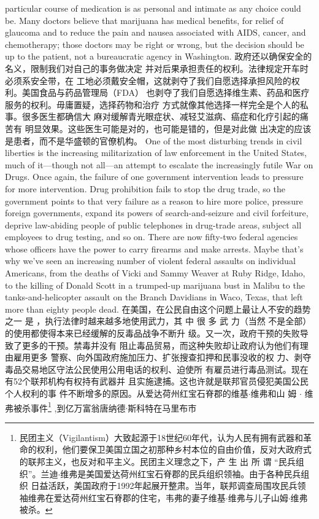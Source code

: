 \begin{paracol}{2}
particular course of medication is as personal and intimate as any choice could be. Many doctors believe that marijuana has
medical benefits, for relief of glaucoma and to reduce the pain
and nausea associated with AIDS, cancer, and chemotherapy;
those doctors may be right or wrong, but the decision should be
up to the patient, not a bureaucratic agency in Washington.
\switchcolumn
政府还以确保安全的名义，限制我们对自己的事务做决定
并对后果承担责任的权利。法律规定开车时必须系安全带，在
工地必须戴安全帽，这就剥夺了我们自愿选择承担风险的权
利。美国食品与药品管理局（FDA） 也剥夺了我们自愿选择维生素、药品和医疗服务的权利。毋庸置疑，选择药物和治疗
方式就像其他选择一样完全是个人的私事。很多医生都确信大
麻对缓解青光眼症状、减轻艾滋病、癌症和化疗引起的痛苦有
明显效果。这些医生可能是对的，也可能是错的，但是对此做
出决定的应该是患者，而不是华盛顿的官僚机构。
\switchcolumn*
One of the most disturbing trends in civil liberties is the increasing militarization of law enforcement in the United States,
much of it---though not all---an attempt to escalate the increasingly futile War on Drugs. Once again, the failure of one
government intervention leads to pressure for more intervention. Drug prohibition fails to stop the drug trade, so the government points to that very failure as a reason to hire more
police, pressure foreign governments, expand its powers of
search-and-seizure and civil forfeiture, deprive law-abiding people of public telephones in drug-trade areas, subject all employees to drug testing, and so on. There are now fifty-two federal
agencies whose officers have the power to carry firearms and
make arrests. Maybe that's why we've seen an increasing number of violent federal assaults on individual Americans, from the
deaths of Vicki and Sammy Weaver at Ruby Ridge, Idaho, to
the killing of Donald Scott in a trumped-up marijuana bust in
Malibu to the tanks-and-helicopter assault on the Branch Davidians in Waco, Texas, that left more than eighty people dead.
\switchcolumn
在美国，在公民自由这个问题上最让人不安的趋势之一
是 ，执行法律时越来越多地使用武力，其 中 很 多 武 力（当然
不是全部）的使用都使得本来已经缓解的反毒品战争不断升
级。又一次，政府干预的失败导致了更多的干预。禁毒并没有
阻止毒品贸易，而这种失败却让政府认为他们有理由雇用更多
警察、向外国政府施加压力、扩张搜查扣押和民事没收的权
力、剥夺毒品交易地区守法公民使用公用电话的权利、迫使所
有雇员进行毒品测试。现在有52个联邦机构有权持有武器并
且实施逮捕。这也许就是联邦官员侵犯美国公民个人权利的事
件不断增多的原因。从爱达荷州红宝石脊郡的维基$\cdot$维弗和山
姆 $\cdot$ 维弗被杀事件\footnote{民团主义（Vigilantism）大致起源于18世纪60年代，认为人民有拥有武器和革命的权利，他们要保卫美国立国之初那种乡村本位的自由价值，反对大政府式的联邦主义，也反对和平主义。民团主义理念之下，产 生 出 所 谓 “民兵组织”。兰迪$\cdot$维弗是美国爱达荷州红宝石脊郡的民兵组织领袖。由于各种民兵组织	日益活跃，美国政府于1992年起展开整肃。当年，联邦调查局围攻民兵领袖维弗在爱达荷州红宝石脊郡的住宅，韦弗的妻子维基$\cdot$维弗与儿子山姆$\cdot$维弗被杀。} ,到亿万富翁唐纳德$\cdot$斯科特在马里布市

\end{paracol}
